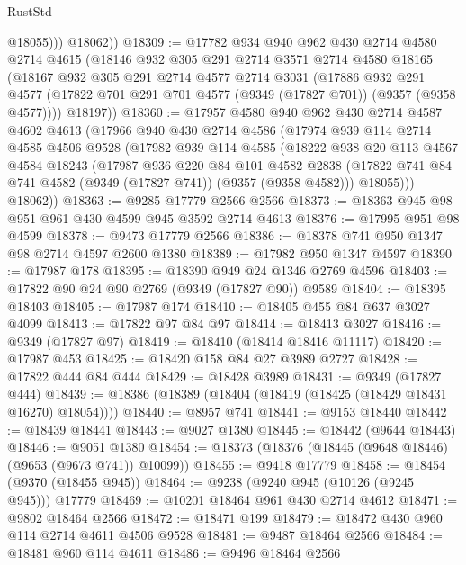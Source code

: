 \begin{lexlean}{RustStd}
\begin{coremodule}
{\begin{coremodule}
{{{{{{{{{{{{{{{{{{{{{{{{{{{{{{{{{{{{{{{              @18055)))
        @18062))
@18309 := @17782
    @934
    @940
    @962
    @430
    @2714
    @4580
    @2714
    @4615
    (@18146
      @932
      @305
      @291
      @2714
      @3571
      @2714
      @4580
      @18165
      (@18167
        @932
        @305
        @291
        @2714
        @4577
        @2714
        @3031
        (@17886
          @932
          @291
          @4577
          (@17822 @701 @291 @701 @4577 (@9349 (@17827 @701)) (@9357 (@9358 @4577))))
        @18197))
@18360 := @17957
    @4580
    @940
    @962
    @430
    @2714
    @4587
    @4602
    @4613
    (@17966
      @940
      @430
      @2714
      @4586
      (@17974
        @939
        @114
        @2714
        @4585
        @4506
        @9528
        (@17982
          @939
          @114
          @4585
          (@18222
            @938
            @20
            @113
            @4567
            @4584
            @18243
            (@17987
              @936
              @220
              @84
              @101
              @4582
              @2838
              (@17822 @741 @84 @741 @4582 (@9349 (@17827 @741)) (@9357 (@9358 @4582)))
              @18055)))
        @18062))
@18363 := @9285 @17779 @2566 @2566
@18373 := @18363 @945 @98 @951 @961 @430 @4599 @945 @3592 @2714 @4613
@18376 := @17995 @951 @98 @4599
@18378 := @9473 @17779 @2566
@18386 := @18378 @741 @950 @1347 @98 @2714 @4597 @2600 @1380
@18389 := @17982 @950 @1347 @4597
@18390 := @17987 @178
@18395 := @18390 @949 @24 @1346 @2769 @4596
@18403 := @17822 @90 @24 @90 @2769 (@9349 (@17827 @90)) @9589
@18404 := @18395 @18403
@18405 := @17987 @174
@18410 := @18405 @455 @84 @637 @3027 @4099
@18413 := @17822 @97 @84 @97
@18414 := @18413 @3027
@18416 := @9349 (@17827 @97)
@18419 := @18410 (@18414 @18416 @11117)
@18420 := @17987 @453
@18425 := @18420 @158 @84 @27 @3989 @2727
@18428 := @17822 @444 @84 @444
@18429 := @18428 @3989
@18431 := @9349 (@17827 @444)
@18439 := @18386 (@18389 (@18404 (@18419 (@18425 (@18429 @18431 @16270) @18054))))
@18440 := @8957 @741
@18441 := @9153 @18440
@18442 := @18439 @18441
@18443 := @9027 @1380
@18445 := @18442 (@9644 @18443)
@18446 := @9051 @1380
@18454 := @18373 (@18376 (@18445 (@9648 @18446) (@9653 (@9673 @741)) @10099))
@18455 := @9418 @17779
@18458 := @18454 (@9370 (@18455 @945))
@18464 := @9238 (@9240 @945 (@10126 (@9245 @945))) @17779
@18469 := @10201 @18464 @961 @430 @2714 @4612
@18471 := @9802 @18464 @2566
@18472 := @18471 @199
@18479 := @18472 @430 @960 @114 @2714 @4611 @4506 @9528
@18481 := @9487 @18464 @2566
@18484 := @18481 @960 @114 @4611
@18486 := @9496 @18464 @2566
}}}}}}}}}}}}}}}}}}}}}}}}}}}}}}}}}}}}}}}
\end{coremodule}}
\end{coremodule}
\end{lexlean}
